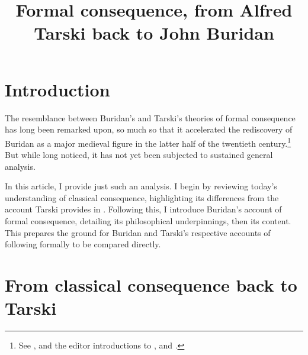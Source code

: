 \documentclass[]{article}
\title{Formal consequence, from Alfred Tarski back to John Buridan}
\author{}
\begin{document}
\maketitle

\section{Introduction}
The resemblance between Buridan's and Tarski's theories of formal consequence has long been remarked upon, 
so much so that it accelerated the rediscovery of Buridan as a major medieval figure in the latter half of the twentieth century.\footnote{See \cite{Moody1952} \cite{Kneale1962} \cite{Dumitriu1974} \cite{DutilhNovaes2012a} \cite{DutilhNovaes2012c} \cite{Parsons2014}, and the editor introductions to \cite{BuridanTC}, \cite{Kretzmann1982} and \cite{King1985}.} 
But while long noticed, 
it has not yet been subjected to sustained general analysis.

In this article, 
I provide just such an analysis. 
I begin by reviewing today's understanding of classical consequence, 
highlighting its differences from the account Tarski provides in \cite{Tarski2002}. 
Following this, 
I introduce Buridan's account of formal consequence, 
detailing its philosophical underpinnings, 
then its content. 
This prepares the ground for Buridan and Tarski's respective accounts of following formally to be compared directly.
\section{From classical consequence back to Tarski}
\end{document}
